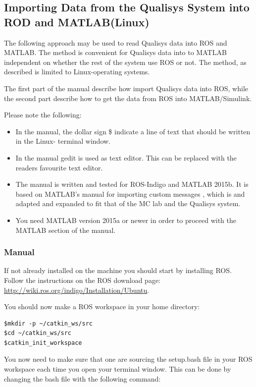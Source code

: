 \documentclass[a4paper,english]{report}
\begin{document}
\subsection{Importing Data from the Qualisys System into ROD and MATLAB(Linux)}
The following approach may be used to read Qualisys data into ROS and MATLAB. The method is convenient for Qualisys data into to MATLAB independent on whether the rest of the system use ROS or not. The method, as described is limited to Linux-operating systems.

The first part of the manual describe how import Qualisys data into ROS, while the second part describe how to get the data from ROS into MATLAB/Simulink.

Please note the following: 
\begin{itemize}
	\item In the manual, the dollar sign \$ indicate a line of text that should be written in the Linux- terminal window.
	\item In the manual gedit is used as text editor. This can be replaced with the readers favourite text editor.
	\item The manual is written and tested for ROS-Indigo and MATLAB 2015b. It is based on MATLAB's manual for importing custom messages \citep{MathWorks2016}, which is and adapted and expanded to fit that of the MC lab and the Qualisys system.
	\item You need MATLAB version 2015a or newer in order to proceed with the MATLAB section of the manual.
\end{itemize}

\subsubsection{Manual}
If not already installed on the machine you should start by installing ROS. Follow the instructions on the ROS download page: \url{http://wiki.ros.org/indigo/Installation/Ubuntu}.

You should now make a ROS workspace in your home directory:

\begin{verbatim}$mkdir -p ~/catkin_ws/src 
$cd ~/catkin_ws/src
$catkin_init_workspace\end{verbatim}

You now need to make sure that one are sourcing the setup.bash file in your ROS workspace each time you open your terminal window. This can be done by changing the bash file with the following command:
\end{document}
